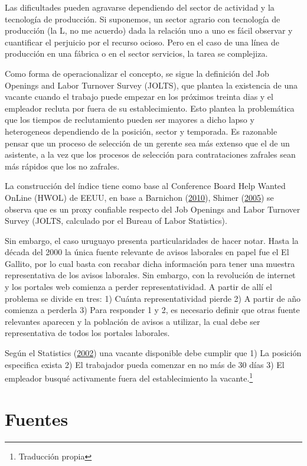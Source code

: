 \documentclass[12pt,twoside]{reedthesis}
\begin{document}
Las dificultades pueden agravarse dependiendo del sector de actividad y la tecnología de producción. Si suponemos, un sector agrario con tecnología de producción (la L, no me acuerdo) dada la relación uno a uno es fácil observar y cuantificar el perjuicio por el recurso ocioso. Pero en el caso de una línea de producción en una fábrica o en el sector servicios, la tarea se complejiza.

Como forma de operacionalizar el concepto, se sigue la definición del Job Openings and Labor Turnover Survey (JOLTS), que plantea la existencia de una vacante cuando el trabajo puede empezar en los próximos treinta dias y el empleador recluta por fuera de su establecimiento. Esto plantea la problemática que los tiempos de reclutamiento pueden ser mayores a dicho lapso y heterogeneos dependiendo de la posición, sector y temporada. Es razonable pensar que un proceso de selección de un gerente sea más extenso que el de un asistente, a la vez que los procesos de selección para contrataciones zafrales sean más rápidos que los no zafrales.

La construcción del índice tiene como base al Conference Board Help Wanted OnLine (HWOL) de EEUU, en base a Barnichon (\protect\hyperlink{ref-Barnichon2010}{2010}), Shimer (\protect\hyperlink{ref-Shimer2005}{2005}) se observa que es un proxy confiable respecto del Job Openings and Labor Turnover Survey (JOLTS, calculado por el Bureau of Labor Statistics).

Sin embargo, el caso uruguayo presenta particularidades de hacer notar. Hasta la década del 2000 la única fuente relevante de avisos laborales en papel fue el El Gallito, por lo cual basta con recabar dicha información para tener una muestra representativa de los avisos laborales. Sin embargo, con la revolución de internet y los portales web comienza a perder representatividad. A partir de allí el problema se divide en tres: 1) Cuánta representatividad pierde 2) A partir de año comienza a perderla 3) Para responder 1 y 2, es necesario definir que otras fuente relevantes aparecen y la población de avisos a utilizar, la cual debe ser representativa de todos los portales laborales.

Según el Statistics (\protect\hyperlink{ref-JOLTS}{2002}) una vacante disponible debe cumplir que 1) La posición especifica exista 2) El trabajador pueda comenzar en no más de 30 días 3) El empleador busqué activamente fuera del establecimiento la vacante.\footnote{Traducción propia}

\hypertarget{fuentes}{%
\section{Fuentes}\label{fuentes}}
\end{document}
